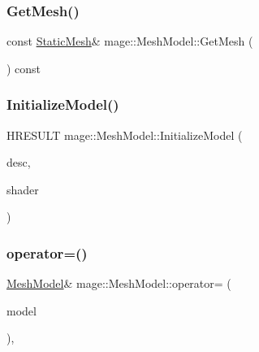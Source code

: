 \subsubsection{\texorpdfstring{Get\+Mesh()}{GetMesh()}}
{\footnotesize\ttfamily const \hyperlink{classmage_1_1_static_mesh}{Static\+Mesh}\& mage\+::\+Mesh\+Model\+::\+Get\+Mesh (\begin{DoxyParamCaption}{ }\end{DoxyParamCaption}) const}

\hypertarget{classmage_1_1_mesh_model_a9971552f5c866b8ed221df056c46a42d}{}\label{classmage_1_1_mesh_model_a9971552f5c866b8ed221df056c46a42d} 
\subsubsection{\texorpdfstring{Initialize\+Model()}{InitializeModel()}}
{\footnotesize\ttfamily H\+R\+E\+S\+U\+LT mage\+::\+Mesh\+Model\+::\+Initialize\+Model (\begin{DoxyParamCaption}\item[{const \hyperlink{classmage_1_1_model_descriptor}{Model\+Descriptor} \&}]{desc,  }\item[{const \hyperlink{structmage_1_1_combined_shader}{Combined\+Shader} \&}]{shader }\end{DoxyParamCaption})\hspace{0.3cm}{\ttfamily [private]}}

\hypertarget{classmage_1_1_mesh_model_a0cffe92f76d2470c67ae71a5a4046259}{}\label{classmage_1_1_mesh_model_a0cffe92f76d2470c67ae71a5a4046259} 
\subsubsection{\texorpdfstring{operator=()}{operator=()}\hspace{0.1cm}{\footnotesize\ttfamily [1/2]}}
{\footnotesize\ttfamily \hyperlink{classmage_1_1_mesh_model}{Mesh\+Model}\& mage\+::\+Mesh\+Model\+::operator= (\begin{DoxyParamCaption}\item[{const \hyperlink{classmage_1_1_mesh_model}{Mesh\+Model} \&}]{model }\end{DoxyParamCaption})\hspace{0.3cm}{\ttfamily [private]}, {\ttfamily [delete]}}

